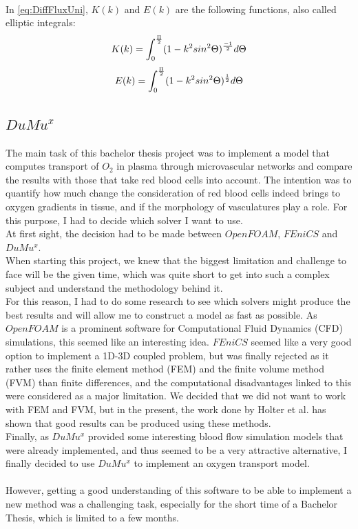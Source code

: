 \\In \ref{eq:DiffFluxUni}, $K(k)$ and $E(k)$ are the following functions, also called elliptic integrals:
%
\begin{equation}
\\K(k) = \int_{0}^{\frac{\Pi}{2}} (1 - k^2 sin^2 \Theta)^ \frac{-1}{2} d \Theta
\label{eq:EllipInt1}
\end{equation}
%
\begin{equation}
\\E(k) = \int_{0}^{\frac{\Pi}{2}} (1 - k^2 sin^2 \Theta)^ \frac{1}{2} d \Theta
\label{eq:EllipInt2}
\end{equation}

\newpage
\subsection{$DuMu^x$}
\label{$DuMu^x$}

The main task of this bachelor thesis project was to implement a model that computes transport of $O_2$ in plasma through microvascular networks and compare the results with those that take red blood cells into account. The intention was to quantify how much change the consideration of red blood cells indeed brings to oxygen gradients in tissue, and if the morphology of vasculatures play a role. For this purpose, I had to decide which solver I want to use.\\
At first sight, the decision had to be made between $OpenFOAM$, $FEniCS$ and $DuMu^x$.
\\When starting this project, we knew that the biggest limitation and challenge to face will be the given time, which was quite short to get into such a complex subject and understand the methodology behind it.
\\For this reason, I had to do some research to see which solvers might produce the best results and will allow me to construct a model as fast as possible. As $OpenFOAM$ is a prominent software for Computational Fluid Dynamics (CFD) simulations, this seemed like an interesting idea. $FEniCS$ seemed like a very good option to implement a 1D-3D coupled problem, but was finally rejected as it rather uses the finite element method (FEM) and the finite volume method (FVM) than finite differences, and the computational disadvantages linked to this were considered as a major limitation. We decided that we did not want to work with FEM and FVM, but in the present, the work done by Holter et al. \cite {holter2018sub} has shown that good results can be produced using these methods.
\\Finally, as $DuMu^x$ provided some interesting blood flow simulation models that were already implemented, and thus seemed to be a very attractive alternative, I finally decided to use $DuMu^x$ to implement an oxygen transport model.\\
\\However, getting a good understanding of this software to be able to implement a new method was a challenging task, especially for the short time of a Bachelor Thesis, which is limited to a few months.
\\

